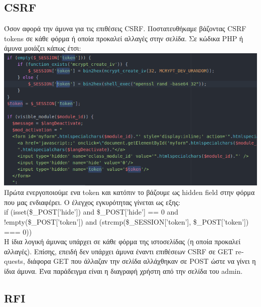 \documentclass{article}
\begin{document}
\subsection*{\textlatin{CSRF}}
Όσον αφορά την άμυνα για τις επιθέσεις \textlatin{CSRF}. Ποστατευθήκαμε βάζοντας \textlatin{CSRF tokens} 
σε κάθε φόρμα ή οποία προκαλεί αλλαγές στην σελίδα. Σε κώδικα \textlatin{PHP} ή άμυνα μοιάζει κάπως 
έτσι:\\
\includegraphics[scale=0.5]{csrf}\\
Πρώτα ενεργοποιούμε ενα \textlatin{token} και κατόπιν το βάζουμε ως \textlatin{hidden field} στην 
φόρμα που μας ενδιαφέρει. Ο έλεγχος εγκυρότητας γίνεται ως εξης:\\
\textlatin{if (isset(\$\_POST['hide']) and \$\_POST['hide'] == 0 and !empty(\$\_POST['token']) and (strcmp(\$\_SESSION['token'], \$\_POST['token']) === 0))}\\
Η ίδια λογική άμυνας υπάρχει σε κάθε φόρμα της ιστοσελίδας (η οποία προκαλεί αλλαγές).
Επίσης, επειδή δεν υπάρχει άμυνα έναντι επιθέσεων \textlatin{CSRF} σε \textlatin{GET requests}, διάφορα 
\textlatin{GET} που άλλαζαν την σελίδα αλλάχθηκαν σε \textlatin{POST} ώστε να γίνει η ίδια άμυνα. 
Ένα παράδειγμα είναι η διαγραφή χρήστη από την σελίδα του \textlatin{admin}.

\subsection*{\textlatin{RFI}}
\end{document}
